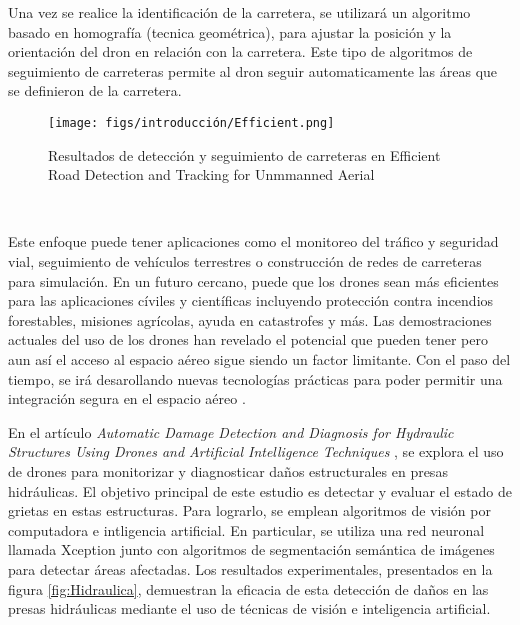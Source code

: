 Una vez se realice la identificación de la carretera, se utilizará un algoritmo basado en homografía (tecnica geométrica), para ajustar la posición y la orientación del dron
en relación con la carretera. Este tipo de algoritmos de seguimiento de carreteras permite al dron seguir automaticamente las áreas que se definieron de la carretera. \newline

\begin{figure} [H]
  \begin{center}
    \texttt{[image: figs/introducción/Efficient.png]}
  \end{center}
  \caption{Resultados de detección y seguimiento de carreteras en Efficient Road Detection and Tracking for Unmmanned Aerial \cite{article}}
  \label{fig:Efficient}
\end{figure}\

Este enfoque puede tener aplicaciones como el monitoreo del tráfico y seguridad vial, seguimiento de vehículos terrestres o construcción de redes de carreteras para simulación. En un futuro cercano, puede que los drones sean más eficientes para las aplicaciones cíviles y científicas incluyendo protección contra incendios forestables, misiones agrícolas, 
ayuda en catastrofes y más. 
Las demostraciones actuales del uso de los drones han revelado el potencial que pueden tener pero aun así el acceso al espacio aéreo sigue siendo un factor limitante. Con el paso del 
tiempo, se irá desarollando nuevas tecnologías prácticas para poder permitir una integración segura en el espacio aéreo \cite{KrejciGarzon_2014}. \newline

En el artículo \textit{Automatic Damage Detection and Diagnosis for Hydraulic Structures Using Drones and Artificial Intelligence Techniques} \cite{rs15030615}, se explora el uso de drones
para monitorizar y diagnosticar daños estructurales en presas hidráulicas. El objetivo principal de este estudio es detectar y evaluar el estado de  grietas en estas estructuras. Para lograrlo, 
se emplean algoritmos de visión por computadora e intligencia artificial. 
En particular, se utiliza una red neuronal llamada Xception \cite{Deeplabv3} junto con algoritmos de segmentación semántica de imágenes para detectar áreas afectadas. Los resultados experimentales, 
presentados en la figura \ref{fig:Hidraulica}, demuestran la eficacia de esta detección de daños en las presas hidráulicas mediante el uso de técnicas de visión e inteligencia artificial. 

